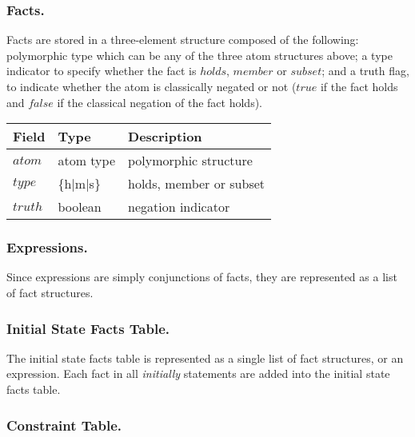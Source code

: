 \documentclass[global,twocolumn,draft]{svjour}
\newenvironment{vquote}
  {\begin{list}{}{\leftmargin 1em}\item[]}
  {\end{list}}
\begin{document}
      \subsubsection{Facts.}

        Facts are stored in a three-element structure composed of the
        following: polymorphic type which can be any of the three atom
        structures above; a type indicator to specify whether the fact is
        $holds$, $member$ or $subset$; and a truth flag, to indicate whether the
        atom is classically negated or not ($true$ if the fact holds
        and $false$ if the classical negation of the fact holds).

        \begin{vquote}
          \begin{tabular}[t]{|l|l|l|}
            \hline
            \textbf{Field} & \textbf{Type} & \textbf{Description} \\
            \hline
            $atom$ & atom type & polymorphic structure \\
            \hline
            $type$ & \{h$|$m$|$s\} & holds, member or subset \\
            \hline
            $truth$ & boolean & negation indicator \\
            \hline
          \end{tabular}
        \end{vquote}

      \subsubsection{Expressions.}

        Since expressions are simply conjunctions of facts, they are
        represented as a list of fact structures.

      \subsubsection{Initial State Facts Table.}

        The initial state facts table is represented as a single list of
        fact structures, or an expression. Each fact in all {\em initially}
        statements are added into the initial state facts table.

      \subsubsection{Constraint Table.}
\end{document}
